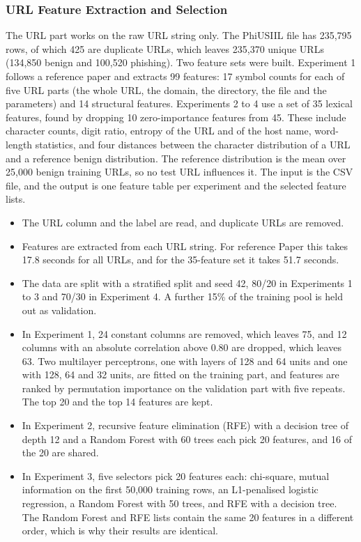 \documentclass{FastFyp}
\begin{document}
\subsubsection{URL Feature Extraction and Selection}
\label{sec:impl-url-features}
The URL part works on the raw URL string only. The PhiUSIIL file has 235,795 rows, of which 425 are duplicate URLs, which leaves 235,370 unique URLs (134,850 benign and 100,520 phishing). Two feature sets were built. Experiment 1 follows a reference paper and extracts 99 features: 17 symbol counts for each of five URL parts (the whole URL, the domain, the directory, the file and the parameters) and 14 structural features. Experiments 2 to 4 use a set of 35 lexical features, found by dropping 10 zero-importance features from 45. These include character counts, digit ratio, entropy of the URL and of the host name, word-length statistics, and four distances between the character distribution of a URL and a reference benign distribution. The reference distribution is the mean over 25,000 benign training URLs, so no test URL influences it. The input is the CSV file, and the output is one feature table per experiment and the selected feature lists.
\begin{itemize}
	\item The URL column and the label are read, and duplicate URLs are removed.
	\item Features are extracted from each URL string. For reference Paper this takes 17.8 seconds for all URLs, and for the 35-feature set it takes 51.7 seconds.
	\item The data are split with a stratified split and seed 42, 80/20 in Experiments 1 to 3 and 70/30 in Experiment 4. A further 15\% of the training pool is held out as validation.
	\item In Experiment 1, 24 constant columns are removed, which leaves 75, and 12 columns with an absolute correlation above 0.80 are dropped, which leaves 63. Two multilayer perceptrons, one with layers of 128 and 64 units and one with 128, 64 and 32 units, are fitted on the training part, and features are ranked by permutation importance on the validation part with five repeats. The top 20 and the top 14 features are kept.
	\item In Experiment 2, recursive feature elimination (RFE) with a decision tree of depth 12 and a Random Forest with 60 trees each pick 20 features, and 16 of the 20 are shared.
	\item In Experiment 3, five selectors pick 20 features each: chi-square, mutual information on the first 50,000 training rows, an L1-penalised logistic regression, a Random Forest with 50 trees, and RFE with a decision tree. The Random Forest and RFE lists contain the same 20 features in a different order, which is why their results are identical.
\end{itemize}
\end{document}
